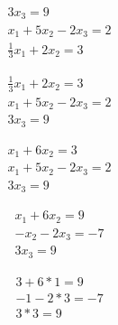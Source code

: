 \documentclass{article}
\begin{document}
\begin{equation}
\begin{split}
3x_{3} = 9 \\
x_{1} + 5x_{2} - 2x_{3} = 2 \\
\frac{1}{3}x_{1} + 2x_{2} = 3
\end{split}
\end{equation}

\begin{equation}
\begin{split}
\frac{1}{3}x_{1} + 2x_{2} = 3 \\
x_{1} + 5x_{2} - 2x_{3} = 2 \\
3x_{3} = 9
\end{split}
\end{equation}

\begin{equation}
\begin{split}
x_{1} + 6x_{2} = 3 \\
x_{1} + 5x_{2} - 2x_{3} = 2 \\
3x_{3} = 9
\end{split}
\end{equation}

\begin{equation}
\begin{split}
x_{1} + 6x_{2} = 9 \\
-x_{2} - 2x_{3} = -7 \\
3x_{3} = 9
\end{split}
\end{equation}

\begin{equation}
\begin{split}
3 + 6 * 1 = 9 \\
-1 - 2 * 3 = -7 \\
3 * 3 = 9
\end{split}
\end{equation}
\end{document}
